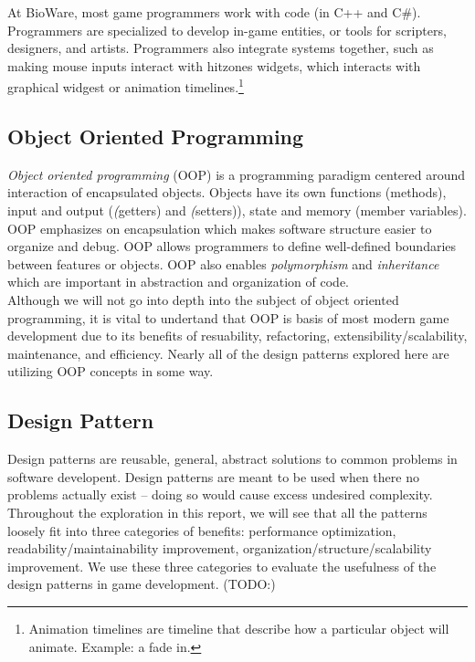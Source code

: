 \documentclass[10pt,letterpaper]{article}
\newcommand{\bs}{\bigskip}
\begin{document}
\begin{multicols}{2}
At BioWare, most game programmers work with code (in C++ and C\#). Programmers are specialized to develop in-game entities, or tools for scripters, designers, and artists. Programmers also integrate systems together, such as making mouse inputs interact with hitzones widgets, which interacts with graphical widgest or animation timelines.\footnote{Animation timelines are timeline that describe how a particular object will animate. Example: a fade in.}

\subsection{Object Oriented Programming}

\textit{Object oriented programming} (OOP) is a programming paradigm centered around interaction of encapsulated objects. Objects have its own functions (methods), input and output (\textit(getters) and \textit(setters)), state and memory (member variables). OOP emphasizes on encapsulation which makes software structure easier to organize and debug. OOP allows programmers to define well-defined boundaries between features or objects. OOP also enables \textit{polymorphism} and \textit{inheritance} which are important in abstraction and organization of code.\cite{oop}\bs
\\
Although we will not go into depth into the subject of object oriented programming, it is vital to undertand that OOP is basis of most modern game development due to its benefits of resuability, refactoring, extensibility/scalability, maintenance, and efficiency\cite{oop}. Nearly all of the design patterns explored here are utilizing OOP concepts in some way. 

\subsection{Design Pattern}

Design patterns are reusable, general, abstract solutions to common problems in software developent.\cite{sm-designpatterns} Design patterns are meant to be used when there no problems actually exist -- doing so would cause excess undesired complexity.\bs
\\
Throughout the exploration in this report, we will see that all the patterns loosely fit into three categories of benefits: performance optimization, readability/maintainability improvement, organization/structure/scalability improvement. We use these three categories to evaluate the usefulness of the design patterns in game development. (TODO:)


\end{multicols}
\end{document}
